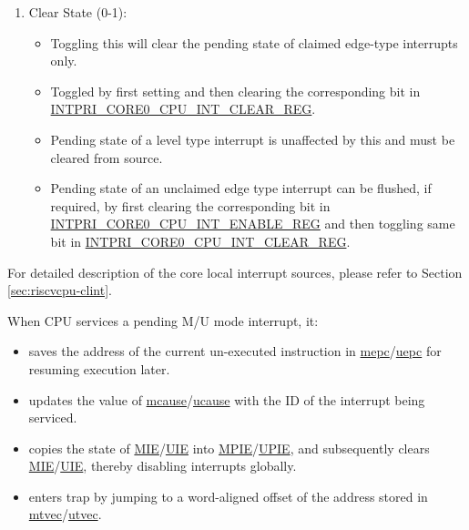 \documentclass[main\_\_EN.tex]{subfiles}
\begin{document}
\begin{enumerate}
\begin{itemize}
        \item A pending interrupt will cause CPU to enter trap if no other pending interrupt has higher priority.
        \item A pending interrupt is said to be 'claimed' if it preempts the CPU and causes it to jump to the corresponding trap vector address.
        \item All pending interrupts which are yet to be serviced are termed as 'unclaimed'.
    \end{itemize}
    \item Clear State (0-1):
    \begin{itemize}
        \item Toggling this will clear the pending state of claimed edge-type interrupts only.
        \item Toggled by first setting and then clearing the corresponding bit in \hyperref[regdesc:INTPRICORE0CPUINTCLEARREG]{INTPRI\_CORE0\_CPU\_INT\_CLEAR\_REG}.
        \item Pending state of a level type interrupt is unaffected by this and must be cleared from source.
        \item Pending state of an unclaimed edge type interrupt can be flushed, if required, by first clearing the corresponding bit in \hyperref[regdesc:INTPRICORE0CPUINTENABLEREG]{INTPRI\_CORE0\_CPU\_INT\_ENABLE\_REG} and then toggling same bit in \hyperref[regdesc:INTPRICORE0CPUINTCLEARREG]{INTPRI\_CORE0\_CPU\_INT\_CLEAR\_REG}.
    \end{itemize}
\end{enumerate}

For detailed description of the core local interrupt sources, please refer to Section \ref{sec:riscvcpu-clint}.

When CPU services a pending M/U mode interrupt, it:
\begin{itemize}
    \item saves the address of the current un-executed instruction in \hyperref[regdesc:MEPC]{mepc}/\hyperref[regdesc:UEPC]{uepc} for resuming execution later.
    \item updates the value of \hyperref[regdesc:MCAUSE]{mcause}/\hyperref[regdesc:UCAUSE]{ucause} with the ID of the interrupt being serviced.
    \item copies the state of \hyperref[fielddesc:MSTATUSMIE]{MIE}/\hyperref[fielddesc:USTATUSUIE]{UIE} into \hyperref[fielddesc:MSTATUSMPIE]{MPIE}/\hyperref[fielddesc:USTATUSUPIE]{UPIE}, and subsequently clears \hyperref[fielddesc:MSTATUSMIE]{MIE}/\hyperref[fielddesc:USTATUSUIE]{UIE}, thereby disabling interrupts globally.
    \item enters trap by jumping to a word-aligned offset of the address stored in \hyperref[regdesc:MTVEC]{mtvec}/\hyperref[regdesc:UTVEC]{utvec}.
\end{itemize}
\end{document}
